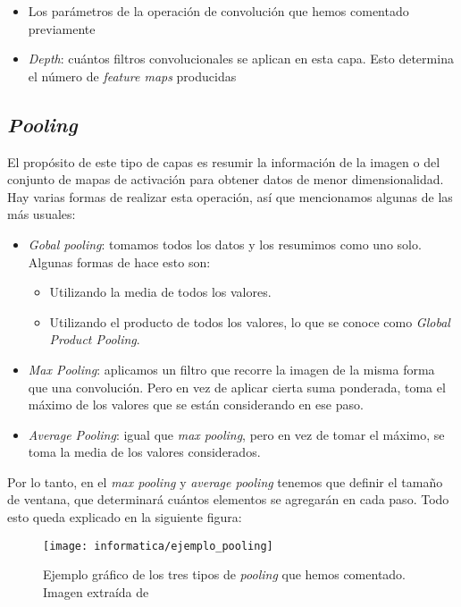 \begin{itemize}
    \item Los parámetros de la operación de convolución que hemos comentado previamente
    \item \textit{Depth}: cuántos filtros convolucionales se aplican en esta capa. Esto determina el número de \textit{feature maps} producidas
\end{itemize}

\subsection{\textit{Pooling}}

El propósito de este tipo de capas es resumir la información de la imagen o del conjunto de mapas de activación para obtener datos de menor dimensionalidad. Hay varias formas de realizar esta operación, así que mencionamos algunas de las más usuales:

\begin{itemize}
    \item \textit{Gobal pooling}: tomamos todos los datos y los resumimos como uno solo. Algunas formas de hace esto son:
        \begin{itemize}
            \item Utilizando la media de todos los valores.
            \item Utilizando el producto de todos los valores, lo que se conoce como \textit{Global Product Pooling}.
        \end{itemize}
    \item \textit{Max Pooling}: aplicamos un filtro que recorre la imagen de la misma forma que una convolución. Pero en vez de aplicar cierta suma ponderada, toma el máximo de los valores que se están considerando en ese paso.
    \item \textit{Average Pooling}: igual que \textit{max pooling}, pero en vez de tomar el máximo, se toma la media de los valores considerados.
\end{itemize}

Por lo tanto, en el \textit{max pooling} y \textit{average pooling} tenemos que definir el tamaño de ventana, que determinará cuántos elementos se agregarán en cada paso. Todo esto queda explicado en la siguiente figura:

\begin{figure}[H]
    \centering
    \texttt{[image: informatica/ejemplo\_pooling]}
    \caption{Ejemplo gráfico de los tres tipos de \textit{pooling} que hemos comentado. Imagen extraída de \cite{informatica:paper_definicion_cnn}}
\end{figure}

